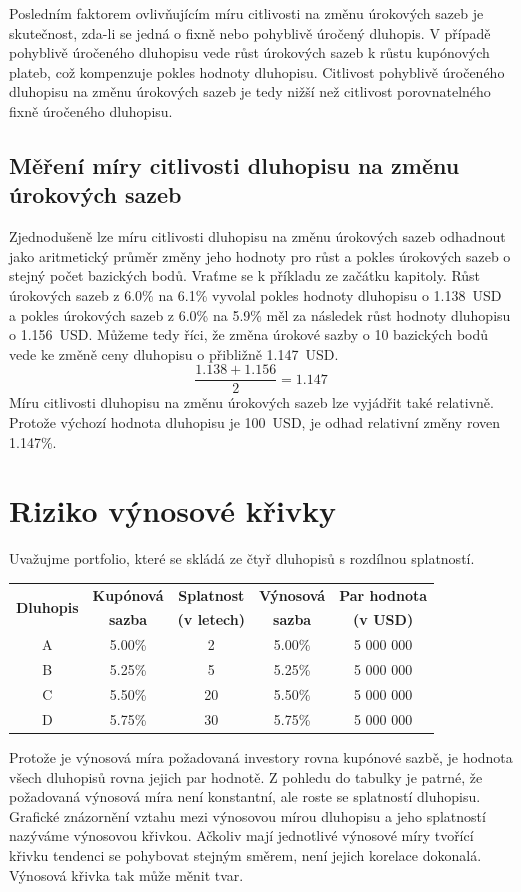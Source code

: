 \documentclass[a4paper]{book}
\begin{document}
Posledním faktorem ovlivňujícím míru citlivosti na změnu úrokových sazeb je skutečnost, zda-li se jedná o fixně nebo pohyblivě úročený dluhopis. V případě pohyblivě úročeného dluhopisu vede růst úrokových sazeb k růstu kupónových plateb, což kompenzuje pokles hodnoty dluhopisu. Citlivost pohyblivě úročeného dluhopisu na změnu úrokových sazeb je tedy nižší než citlivost porovnatelného fixně úročeného dluhopisu.

\subsection{Měření míry citlivosti dluhopisu na změnu úrokových sazeb}

Zjednodušeně lze míru citlivosti dluhopisu na změnu úrokových sazeb odhadnout jako aritmetický průměr změny jeho hodnoty pro růst a pokles úrokových sazeb o stejný počet bazických bodů. Vraťme se k příkladu ze začátku kapitoly. Růst úrokových sazeb z 6.0\% na 6.1\% vyvolal pokles hodnoty dluhopisu o 1.138~USD a pokles úrokových sazeb z 6.0\% na 5.9\% měl za následek růst hodnoty dluhopisu o 1.156~USD. Můžeme tedy říci, že změna úrokové sazby o 10 bazických bodů vede ke změně ceny dluhopisu o přibližně 1.147~USD.
\begin{equation*}
\frac{1.138 + 1.156}{2} = 1.147
\end{equation*}
Míru citlivosti dluhopisu na změnu úrokových sazeb lze vyjádřit také relativně. Protože výchozí hodnota dluhopisu je 100~USD, je odhad relativní změny roven 1.147\%.

\section{Riziko výnosové křivky}

Uvažujme portfolio, které se skládá ze čtyř dluhopisů s rozdílnou splatností.
\begin{center}
\begin{tabular}{c c c c c}
\multirow{2}{*}{\textbf{Dluhopis}} & \textbf{Kupónová} & \textbf{Splatnost} & \textbf{Výnosová} & \textbf{Par hodnota} \\
 & \textbf{sazba} & \textbf{(v letech)} & \textbf{sazba} & \textbf{(v USD)} \\
\hline
A & 5.00\% & 2 & 5.00\% & 5 000 000 \\
B & 5.25\% & 5 & 5.25\% & 5 000 000 \\
C & 5.50\% & 20 & 5.50\% & 5 000 000 \\
D & 5.75\% & 30 & 5.75\% & 5 000 000 \\
\end{tabular}
\end{center}
Protože je výnosová míra požadovaná investory rovna kupónové sazbě, je hodnota všech dluhopisů rovna jejich par hodnotě. Z pohledu do tabulky je patrné, že požadovaná výnosová míra není konstantní, ale roste se splatností dluhopisu. Grafické znázornění vztahu mezi výnosovou mírou dluhopisu a jeho splatností nazýváme výnosovou křivkou. Ačkoliv mají jednotlivé výnosové míry tvořící křivku tendenci se pohybovat stejným směrem, není jejich korelace dokonalá. Výnosová křivka tak může měnit tvar.
\end{document}
